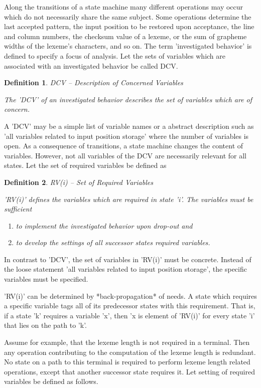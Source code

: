 \documentclass[12pt]{article}
\newtheorem{definition}{Definition}
\begin{document}
Along the transitions of a state machine many different operations may occur
which do not necessarily share the same subject. Some operations determine the
last accepted pattern, the input position to be restored upon acceptance, the
line and column numbers, the checksum value of a lexeme, or the sum of grapheme
widths of the lexeme's characters, and so on. The term 'investigated behavior'
is defined to specify a focus of analysis.  Let the sets of variables which are
associated with an investigated behavior be called DCV.

\begin{definition}
DCV -- Description of Concerned Variables

The 'DCV' of an investigated behavior describes the set of variables which
are of concern. 
\end{definition}

A 'DCV' may be a simple list of variable names or a abstract description such
as 'all variables related to input position storage' where the number of
variables is open.  As a consequence of transitions, a state machine changes
the content of variables. However, not all variables of the DCV are necessarily
relevant for all states. Let the set of required variables be defined as

\begin{definition}
RV(i) -- Set of Required Variables

'RV(i)' defines the variables which are required in state 'i'. The
variables must be sufficient

\begin{enumerate}
\item  to implement the investigated behavior upon drop-out and
\item to develop the settings of all successor states required variables.
\end{enumerate}
\end{definition}

In contrast to 'DCV', the set of variables in 'RV(i)' must be concrete.
Instead of the loose statement 'all variables related to input position
storage', the specific variables must be specified. 

'RV(i)' can be determined by *back-propagation* of needs. A state which
requires a specific variable tags all of its predecessor states with this
requirement. That is, if a state 'k' requires a variable 'x', then 'x is
element of 'RV(i)' for every state 'i' that lies on the path to 'k'.

Assume for example, that the lexeme length is not required in a terminal. Then
any operation contributing to the computation of the lexeme length is
redundant.  No state on a path to this terminal is required to perform lexeme
length related operations, except that another successor state requires it.
Let setting of required variables be defined as follows.
\end{document}
